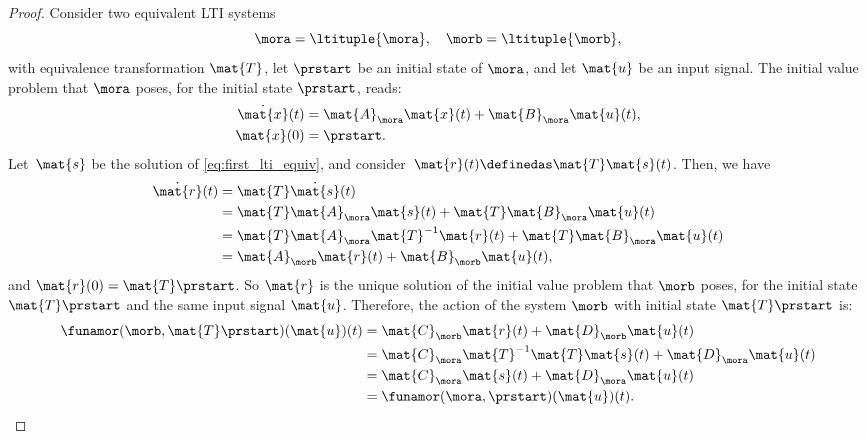 \begin{proof}
    Consider two equivalent LTI systems
    \begin{equation}
        \mora = \ltituple{\mora},\quad \morb = \ltituple{\morb},
    \end{equation}
    with equivalence transformation $\mat{T}$, let $\prstart$ be an initial state of $\mora$, and let $\mat{u}$ be an input signal.
    The initial value problem that $\mora$ poses, for the initial state $\prstart$, reads:
    \begin{equation}
        \label{eq:first_lti_equiv}
        \begin{aligned}
            \dot{\mat{x}}(t) & =\mat{A}_{\mora}\mat{x}(t)+\mat{B}_{\mora}\mat{u}(t), \\
            \mat{x}(0)       & = \prstart.
        \end{aligned}
    \end{equation}
    Let~$\mat{s}$ be the solution of \cref{eq:first_lti_equiv}, and consider~$\mat{r}(t) \definedas \mat{T}\mat{s}(t)$.
    Then, we have
    \begin{equation}
        \begin{aligned}
            \dot{\mat{r}}(t) & =\mat{T}\dot{\mat{s}}(t) \\
                             & =\mat{T}\mat{A}_\mora \mat{s}(t)+\mat{T}\mat{B}_\mora \mat{u}(t) \\
                             & =\mat{T}\mat{A}_\mora \mat{T}^{-1}\mat{r}(t)+\mat{T}\mat{B}_\mora \mat{u}(t) \\
                             & =\mat{A}_\morb\mat{r}(t)+\mat{B}_\morb \mat{u}(t),
        \end{aligned}
    \end{equation}
    and $\mat{r}(0) = \mat{T} \prstart$.
    So $\mat{r}$ is the unique solution of the initial value problem that $\morb$ poses, for the initial state $\mat{T}\prstart$ and the same input signal $\mat{u}$.
    Therefore, the action of the system $\morb$ with initial state $\mat{T}\prstart$ is:
    \begin{equation}
        \begin{aligned}
            \funamor(\morb, \mat{T}\prstart)(\mat{u})(t) & =\mat{C}_\morb \mat{r}(t)+ \mat{D}_\morb \mat{u}(t) \\
                                        & =\mat{C}_\mora \mat{T}^{-1}\mat{T}\mat{s}(t)+\mat{D}_\mora \mat{u}(t) \\
                                        & =\mat{C}_\mora \mat{s}(t)+\mat{D}_\mora \mat{u}(t) \\
                                        & =\funamor(\mora, \prstart)(\mat{u})(t).
        \end{aligned}
    \end{equation}
\end{proof}

